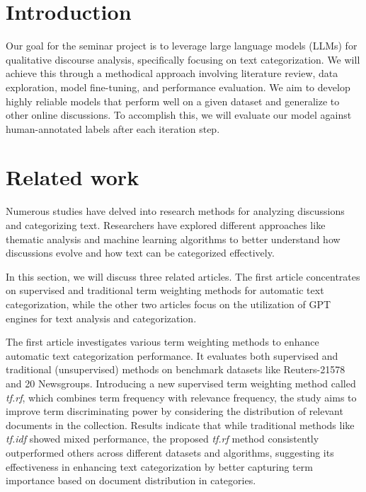 \documentclass[fleqn,moreauthors,10pt]{ds_report}
\affiliation{\textit{Advisors: Slavko Žitnik}}
\begin{document}
\flushbottom 

\maketitle 

\thispagestyle{empty} 


\section*{Introduction}
Our goal for the seminar project is to leverage large language models (LLMs) for qualitative discourse analysis, specifically focusing on text categorization. We will achieve this through a methodical approach involving literature review, data exploration, model fine-tuning, and performance evaluation. We aim to develop highly reliable models that perform well on a given dataset and generalize to other online discussions. To accomplish this, we will evaluate our model against human-annotated labels after each iteration step.

\section*{Related work}

Numerous studies have delved into research methods for analyzing discussions and categorizing text. Researchers have explored different approaches like thematic analysis and machine learning algorithms to better understand how discussions evolve and how text can be categorized effectively.

In this section, we will discuss three related articles. The first article concentrates on supervised and traditional term weighting methods for automatic text categorization, while the other two articles focus on the utilization of GPT engines for text analysis and categorization.

The first article \cite{4509437} investigates various term weighting methods to enhance automatic text categorization performance. It evaluates both supervised and traditional (unsupervised) methods on benchmark datasets like Reuters-21578 and 20 Newsgroups. Introducing a new supervised term weighting method called \textit{tf.rf}, which combines term frequency with relevance frequency, the study aims to improve term discriminating power by considering the distribution of relevant documents in the collection. Results indicate that while traditional methods like \textit{tf.idf} showed mixed performance, the proposed \textit{tf.rf} method consistently outperformed others across different datasets and algorithms, suggesting its effectiveness in enhancing text categorization by better capturing term importance based on document distribution in categories.
\end{document}
